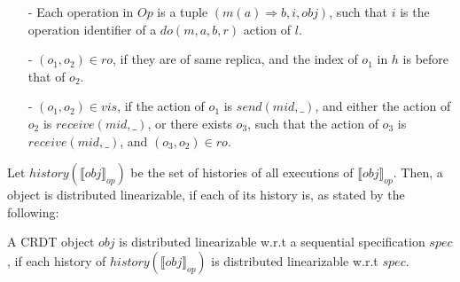 {\begin{itemize}
\setlength{\itemsep}{0.5pt}
\item[-] Each operation in $\mathit{Op}$ is a tuple $(m(a) \Rightarrow b,i,\mathit{obj})$, such that $i$ is the operation identifier of a $\mathit{do}(m,a,b,r)$ action of $l$.

\item[-] $(o_1,o_2) \in \mathit{ro}$, if they are of same replica, and the index of $o_1$ in $h$ is before that of $o_2$.

\item[-] $(o_1,o_2) \in \mathit{vis}$, if the action of $o_1$ is $\mathit{send}(\mathit{mid},\_)$, and either the action of $o_2$ is $\mathit{receive}(\mathit{mid},\_)$, or there exists $o_3$, such that the action of $o_3$ is $\mathit{receive}(\mathit{mid},\_)$, and $(o_3,o_2) \in \mathit{ro}$.
\end{itemize}

Let $\mathit{history}(\llbracket \mathit{obj} \rrbracket_{\mathit{op}})$ be the set of histories of all executions of $\llbracket \mathit{obj} \rrbracket_{\mathit{op}}$. Then, a object is distributed linearizable, if each of its history is, as stated by the following:

\begin{definition}
\label{definition:correctness of a CRDT object}
A CRDT object $\mathit{obj}$ is distributed linearizable w.r.t a sequential specification $\mathit{spec}$, if each history of $\mathit{history}(\llbracket \mathit{obj} \rrbracket_{\mathit{op}})$ is distributed linearizable w.r.t $\mathit{spec}$.
\end{definition}
}





















